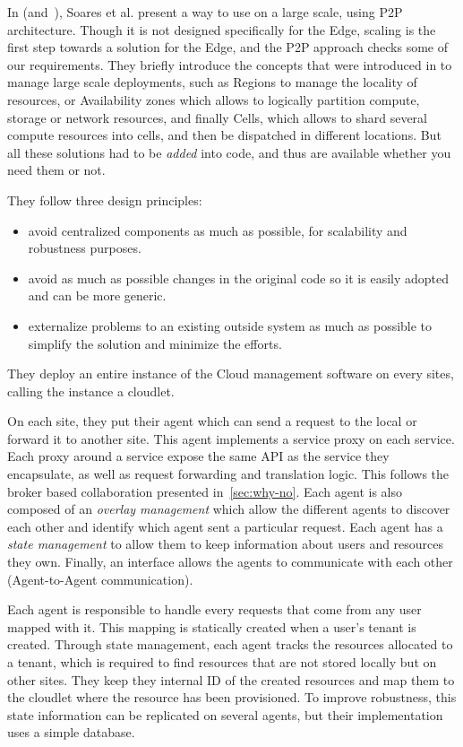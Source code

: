 In\cite{SYHJ17} (and~\cite{Han17}), Soares et al. present a way to use
\os on a large scale, using \acrshort{P2P} architecture.
%
Though it is not designed specifically for the Edge, scaling is the
first step towards a solution for the Edge, and the \acrshort{P2P} approach
checks some of our requirements.
%
They briefly introduce the concepts that were introduced in \os to
manage large scale deployments, such as Regions to manage the locality
of resources, or Availability zones which allows to logically
partition compute, storage or network resources, and finally Cells,
which allows to shard several compute resources into cells, and then
be dispatched in different locations.
%
But all these solutions had to be \emph{added} into \os code, and thus
are available whether you need them or not.

They follow three design principles:
\begin{itemize}
\item avoid centralized components as much as possible, for
  scalability and robustness purposes.
\item avoid as much as possible changes in the original code so it is
  easily adopted and can be more generic.
\item externalize problems to an existing outside system as much as
  possible to simplify the solution and minimize the efforts.
\end{itemize}

%
They deploy an entire instance of the Cloud management software on
every sites, calling the instance a \gls{cloudlet}.

%
On each site, they put their agent which can send a request to the
local \os or forward it to another site.
%
This agent implements a service proxy on each \os service.
%
Each proxy around a service expose the same \acrshort{API} as the
service they encapsulate, as well as request forwarding and
translation logic.
%
This follows the broker based collaboration presented
in~\autoref{sec:why-no}.
%
Each agent is also composed of an \emph{overlay management} which
allow the different agents to discover each other and identify which
agent sent a particular request.
%
Each agent has a \emph{state management} to allow them to keep
information about users and resources they own.
%
Finally, an interface allows the agents to communicate with each other
(Agent-to-Agent communication).

Each agent is responsible to handle every requests that come from any
user mapped with it.
%
This mapping is statically created when a user's tenant is created.
%
Through state management, each agent tracks the resources allocated to
a tenant, which is required to find resources that are not stored
locally but on other sites.
%
They keep they internal ID of the created resources and map them to
the cloudlet where the resource has been provisioned.
%
To improve robustness, this state information can be replicated on
several agents, but their implementation uses a simple database.

